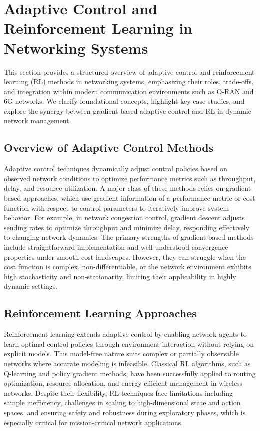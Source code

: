 \documentclass[sigconf]{acmart}
\begin{document}
\section{Adaptive Control and Reinforcement Learning in Networking Systems}

This section provides a structured overview of adaptive control and reinforcement learning (RL) methods in networking systems, emphasizing their roles, trade-offs, and integration within modern communication environments such as O-RAN and 6G networks. We clarify foundational concepts, highlight key case studies, and explore the synergy between gradient-based adaptive control and RL in dynamic network management.

\subsection{Overview of Adaptive Control Methods}

Adaptive control techniques dynamically adjust control policies based on observed network conditions to optimize performance metrics such as throughput, delay, and resource utilization. A major class of these methods relies on gradient-based approaches, which use gradient information of a performance metric or cost function with respect to control parameters to iteratively improve system behavior. For example, in network congestion control, gradient descent adjusts sending rates to optimize throughput and minimize delay, responding effectively to changing network dynamics. The primary strengths of gradient-based methods include straightforward implementation and well-understood convergence properties under smooth cost landscapes. However, they can struggle when the cost function is complex, non-differentiable, or the network environment exhibits high stochasticity and non-stationarity, limiting their applicability in highly dynamic settings.

\subsection{Reinforcement Learning Approaches}

Reinforcement learning extends adaptive control by enabling network agents to learn optimal control policies through environment interaction without relying on explicit models. This model-free nature suits complex or partially observable networks where accurate modeling is infeasible. Classical RL algorithms, such as Q-learning and policy gradient methods, have been successfully applied to routing optimization, resource allocation, and energy-efficient management in wireless networks. Despite their flexibility, RL techniques face limitations including sample inefficiency, challenges in scaling to high-dimensional state and action spaces, and ensuring safety and robustness during exploratory phases, which is especially critical for mission-critical network applications.
\end{document}
